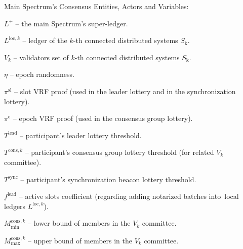\noindent
Main Spectrum's Consensus Entities, Actors and Variables:
\begin{legal}
    \item[] $L^+$ -- the main Spectrum's super-ledger.
    \item[] $L^{\text{loc}, k}$ -- ledger of the $k$-th connected distributed systems $S_{\text{k}}$.
    \item[] $V_k$ -- validators set of $k$-th connected distributed systems $S_{\text{k}}$.
    \item[] $\eta$ -- epoch randomness.
    \item[] $\pi^{\text{sl}}$ -- slot VRF proof (used in the leader lottery and in the synchronization lottery).
    \item[] $\pi^{\text{e}}$ -- epoch VRF proof (used in the consensus group lottery).
    \item[] $T^{\text{lead}}$ -- participant's leader lottery threshold.
    \item[] $T^{\text{cons},k}$ -- participant's consensus group lottery threshold (for related $V_k$ committee).
    \item[] $T^{\text{sync}}$ -- participant's synchronization beacon lottery threshold.
    \item[] $f^{\text{lead}}$ -- active slots coefficient (regarding adding notarized batches into\
    local ledgers $L^{\text{loc}, k}$).
    \item[] $M^{\text{cons}, k}_{\min}$ -- lower bound of members in the $V_k$ committee.
    \item[] $M^{\text{cons}, k}_{\max}$ -- upper bound of members in the $V_k$ committee.
\end{legal}
